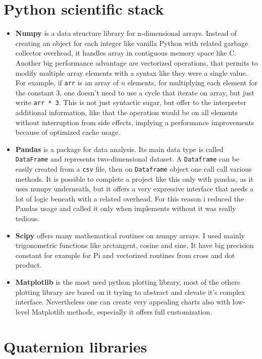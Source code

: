 \section{Python scientific stack}
\begin{itemize}
	\item \textbf{Numpy} is a data structure library for n-dimensional arrays. Instead of creating an object for each integer like vanilla Python with related garbage collector overhead, it handles array in contiguous memory space like C. Another big performance advantage are vectorized operations, that permits to modify multiple array elements with a syntax like they were a single value. For example, if \texttt{arr} is an array of $n$ elements, for multiplying each element for the constant 3, one doesn't need to use a cycle that iterate on array, but just write \texttt{arr * 3}. This is not just syntactic sugar, but offer to the interpreter additional information, like that the operation would be on all elements without interruption from side effects, implying a performance improvements because of optimized cache usage.
	\item \textbf{Pandas} is a package for data analysis. Its main data type is called \texttt{DataFrame} and represents two-dimensional dataset. A \texttt{Dataframe} can be easily created from a \texttt{csv} file, then on \texttt{Dataframe} object one call call various methods. It is possible to complete a project like this only with pandas, as it uses numpy underneath, but it offers a very expressive interface that needs a lot of logic beneath with a related overhead. For this reason i reduced the Pandas usage and called it only when implements without it was really tedious.
	\item \textbf{Scipy} offers many mathematical routines on numpy arrays. I used mainly trigonometric functions like arctangent, cosine and sine. It have big precision constant for example for Pi and vectorized routines from cross and dot product.
	\item \textbf{Matplotlib} is the most used python plotting library, most of the others plotting library are based on it trying to abstract and elevate it's complex interface. Nevertheless one can create very appealing charts also with low-level Matplotlib methods, especially it offers full customization.
\end{itemize}

\section{Quaternion libraries}

